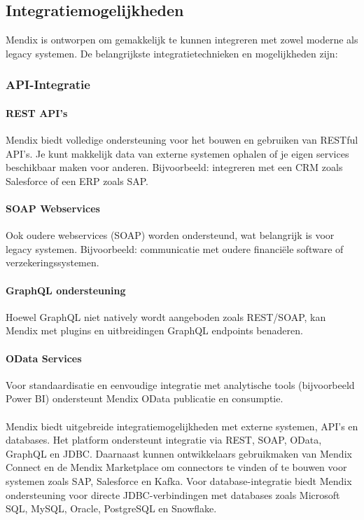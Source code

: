 \subsection{Integratiemogelijkheden}
Mendix is ontworpen om gemakkelijk te kunnen integreren met zowel moderne als legacy systemen. De belangrijkste integratietechnieken en mogelijkheden zijn:
\subsubsection{API-Integratie}
\paragraph{REST API's}
Mendix biedt volledige ondersteuning voor het bouwen en gebruiken van RESTful API's. Je kunt makkelijk data van externe systemen ophalen of je eigen services beschikbaar maken voor anderen.
Bijvoorbeeld: integreren met een CRM zoals Salesforce of een ERP zoals SAP.
\paragraph{SOAP Webservices}
Ook oudere webservices (SOAP) worden ondersteund, wat belangrijk is voor legacy systemen.
Bijvoorbeeld: communicatie met oudere financiële software of verzekeringssystemen.

\paragraph{GraphQL ondersteuning}
Hoewel GraphQL niet natively wordt aangeboden zoals REST/SOAP, kan Mendix met plugins en uitbreidingen GraphQL endpoints benaderen.

\paragraph{OData Services}
Voor standaardisatie en eenvoudige integratie met analytische tools (bijvoorbeeld Power BI) ondersteunt Mendix OData publicatie en consumptie.
\\
\\
Mendix biedt uitgebreide integratiemogelijkheden met externe systemen, API’s en databases. Het platform ondersteunt integratie via REST, SOAP, OData, GraphQL en JDBC. Daarnaast kunnen ontwikkelaars gebruikmaken van Mendix Connect en de Mendix Marketplace om connectors te vinden of te bouwen voor systemen zoals SAP, Salesforce en Kafka. Voor database-integratie biedt Mendix ondersteuning voor directe JDBC-verbindingen met databases zoals Microsoft SQL, MySQL, Oracle, PostgreSQL en Snowflake.

